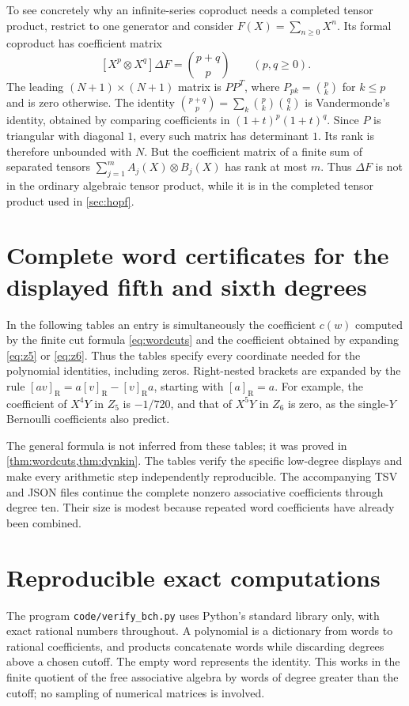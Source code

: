 \documentclass[11pt]{article}
\numberwithin{equation}{section}
\theoremstyle{definition}
\theoremstyle{remark}
\newcommand{\RB}[1]{[#1]_{\mathrm R}}
\begin{document}
To see concretely why an infinite-series coproduct needs a
completed tensor product, restrict to one generator and consider
$F(X)=\sum_{n\geq0}X^n$. Its formal coproduct has coefficient matrix
\[
 [X^p\otimes X^q]\Delta F=\binom{p+q}{p}\qquad(p,q\geq0).
\]
The leading $(N+1)\times(N+1)$ matrix is $PP^T$, where
$P_{pk}=\binom pk$ for $k\leq p$ and is zero otherwise. The identity
$\binom{p+q}{p}=\sum_k\binom pk\binom qk$ is Vandermonde's
identity, obtained by comparing coefficients in
$(1+t)^p(1+t)^q$. Since $P$ is triangular with diagonal $1$,
every such matrix has determinant $1$. Its rank is therefore
unbounded with $N$. But the coefficient matrix of a finite sum of
separated tensors $\sum_{j=1}^m A_j(X)\otimes B_j(X)$ has rank
at most $m$. Thus $\Delta F$ is not in the ordinary algebraic
tensor product, while it is in the completed tensor product used
in \cref{sec:hopf}.

\section{Complete word certificates for the displayed fifth and sixth degrees}
\label{sec:certificate}
In the following tables an entry is simultaneously the coefficient
$c(w)$ computed by the finite cut formula \eqref{eq:wordcuts} and
the coefficient obtained by expanding \eqref{eq:z5} or
\eqref{eq:z6}. Thus the tables specify every coordinate needed for
the polynomial identities, including zeros. Right-nested brackets
are expanded by the rule
$\RB{av}=a\RB{v}-\RB{v}a$, starting with $\RB{a}=a$.
For example, the coefficient of $X^4Y$ in $Z_5$ is $-1/720$,
and that of $X^5Y$ in $Z_6$ is zero, as the single-$Y$ Bernoulli
coefficients also predict.



The general formula is not inferred from these tables; it was
proved in \cref{thm:wordcuts,thm:dynkin}. The tables verify the
specific low-degree displays and make every arithmetic step
independently reproducible. The accompanying TSV and JSON files
continue the complete nonzero associative coefficients through
degree ten. Their size is modest because repeated word coefficients
have already been combined.

\section{Reproducible exact computations}
\label{sec:reproducibility}
The program \texttt{code/verify\_bch.py} uses Python's standard
library only, with exact rational numbers throughout. A polynomial
is a dictionary from words to rational coefficients, and products
concatenate words while discarding degrees above a chosen cutoff.
The empty word represents the identity. This works in the finite
quotient of the free associative algebra by words of degree greater
than the cutoff; no sampling of numerical matrices is involved.
\end{document}
